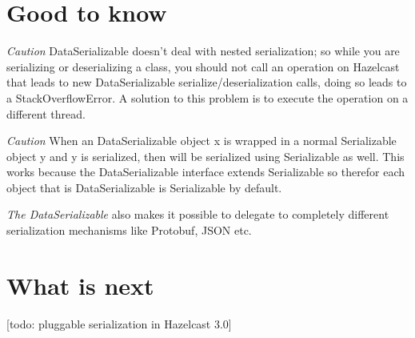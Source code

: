 \section{Good to know}

\emph{Caution} DataSerializable doesn't deal with nested serialization; so while you are serializing or deserializing a class, you should not call an operation on Hazelcast that leads to new DataSerializable serialize/deserialization calls,  doing so leads to a StackOverflowError. A solution to this problem is to execute the operation on a different thread. 

\emph{Caution} When an DataSerializable object x is wrapped in a normal Serializable object y and y is serialized, then will be serialized using Serializable as well. This works because the DataSerializable interface extends Serializable so therefor each object that is DataSerializable is Serializable by default.

\emph{The DataSerializable} also makes it possible to delegate to completely different serialization mechanisms like Protobuf, JSON etc.

\section{What is next}

[todo: pluggable serialization in Hazelcast 3.0]